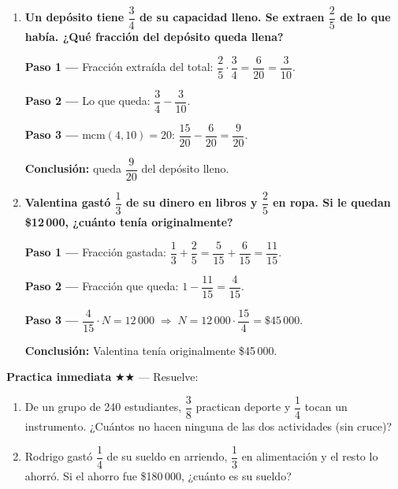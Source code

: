 \documentclass[11pt, letterpaper]{article}
\begin{document}
\begin{tcolorbox}[examplebox, title={Ejemplos}]
\begin{enumerate}[label=\textbf{Ej. \arabic*.}, leftmargin=*, itemsep=14pt]

\item \textbf{Un dep\'osito tiene $\dfrac{3}{4}$ de su capacidad lleno. Se extraen $\dfrac{2}{5}$ de lo que hab\'ia. ¿Qu\'e fracci\'on del dep\'osito queda llena?}

\textbf{Paso 1 ---} Fracci\'on extra\'ida del total: $\dfrac{2}{5} \cdot \dfrac{3}{4} = \dfrac{6}{20} = \dfrac{3}{10}$.

\textbf{Paso 2 ---} Lo que queda: $\dfrac{3}{4} - \dfrac{3}{10}$.

\textbf{Paso 3 ---} $\text{mcm}(4,10)=20$: $\dfrac{15}{20}-\dfrac{6}{20}=\dfrac{9}{20}$.

\textbf{Conclusi\'on:} queda $\dfrac{9}{20}$ del dep\'osito lleno. \checkmark

\item \textbf{Valentina gast\'o $\dfrac{1}{3}$ de su dinero en libros y $\dfrac{2}{5}$ en ropa. Si le quedan \$12\,000, ¿cu\'anto ten\'ia originalmente?}

\textbf{Paso 1 ---} Fracci\'on gastada: $\dfrac{1}{3}+\dfrac{2}{5}=\dfrac{5}{15}+\dfrac{6}{15}=\dfrac{11}{15}$.

\textbf{Paso 2 ---} Fracci\'on que queda: $1-\dfrac{11}{15}=\dfrac{4}{15}$.

\textbf{Paso 3 ---} $\dfrac{4}{15}\cdot N = 12\,000 \;\Rightarrow\; N = 12\,000\cdot\dfrac{15}{4} = \$45\,000$.

\textbf{Conclusi\'on:} Valentina ten\'ia originalmente \$45\,000. \checkmark

\end{enumerate}
\end{tcolorbox}

\medskip
\textbf{Practica inmediata} \quad $\bigstar\bigstar$ --- Resuelve:
\begin{enumerate}[label=\alph*), leftmargin=*]
  \item De un grupo de 240 estudiantes, $\dfrac{3}{8}$ practican deporte y $\dfrac{1}{4}$ tocan un instrumento. ¿Cu\'antos no hacen ninguna de las dos actividades (sin cruce)?
  \item Rodrigo gast\'o $\dfrac{1}{4}$ de su sueldo en arriendo, $\dfrac{1}{3}$ en alimentaci\'on y el resto lo ahorr\'o. Si el ahorro fue \$180\,000, ¿cu\'anto es su sueldo?
\end{enumerate}
\end{document}
